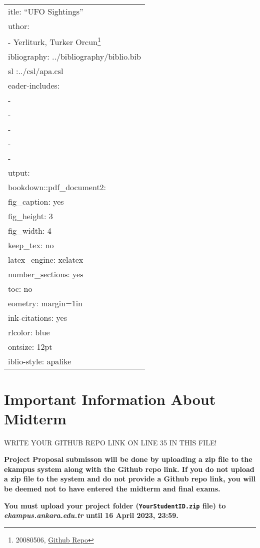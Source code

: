 \documentclass[
]{article}
\author{}
\date{\vspace{-2.5em}}
\begin{document}
{
\setcounter{tocdepth}{2}
\tableofcontents
}
\begin{longtable}[]{@{}l@{}}
\toprule()
\endhead
itle: ``UFO Sightings'' \\
uthor: \\
- Yerliturk, Turker Orcun\footnote{20080506, \href{https://github.com/orcunyerliturk/midterm}{Github Repo}} \\
ibliography: ../bibliography/biblio.bib \\
sl :../csl/apa.csl \\
eader-includes: \\
- \\
- \\
- \\
- \\
- \captionsetup[table]{skip=10pt} \\
utput: \\
bookdown::pdf\_document2: \\
fig\_caption: yes \\
fig\_height: 3 \\
fig\_width: 4 \\
keep\_tex: no \\
latex\_engine: xelatex \\
number\_sections: yes \\
toc: no \\
eometry: margin=1in \\
ink-citations: yes \\
rlcolor: blue \\
ontsize: 12pt \\
iblio-style: apalike \\
\bottomrule()
\end{longtable}

\hypertarget{important-information-about-midterm}{%
\section{Important Information About Midterm}\label{important-information-about-midterm}}

\colorbox{BurntOrange}{WRITE YOUR GITHUB REPO LINK ON LINE 35 IN THIS FILE!}

\textbf{Project Proposal submisson will be done by uploading a zip file to the ekampus system along with the Github repo link. If you do not upload a zip file to the system and do not provide a Github repo link, you will be deemed not to have entered the midterm and final exams.}

\textbf{You must upload your project folder (\texttt{YourStudentID.zip} file) to \emph{ekampus.ankara.edu.tr} until 16 April 2023, 23:59.}
\end{document}
